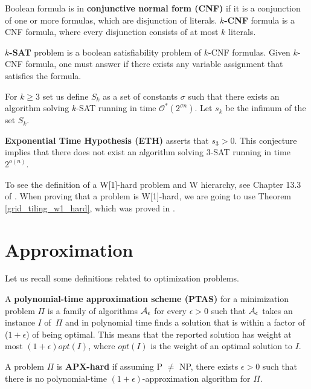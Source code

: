 \begin{defi}
\label{definition:cnf}
Boolean formula is in \textbf{conjunctive normal form (CNF)} if
it is a conjunction of one or more formulas,
which are disjunction of literals.
\textbf{$k$-CNF} formula is a CNF formula, where
every disjunction consists of at most $k$ literals.
\end{defi}

\begin{defi}
\textbf{$k$-SAT} problem is 
a boolean satisfiability problem of $k$-CNF formulas.
Given $k$-CNF formula, one must answer if there
exists any variable assignment that satisfies the formula.
\end{defi}

\begin{defi}
For $k \ge 3$ set us define $S_k$ as a set of constants $\sigma$
such that there exists an algorithm solving $k$-SAT running in time
$\mathcal{O}^{*}(2^{\sigma n})$.
Let $s_k$ be the infimum  of the set $S_k$.

\textbf{Exponential Time Hypothesis (ETH)} asserts
that $s_3 > 0$. This conjecture implies that
there does not exist an algorithm solving 3-SAT
running in time $2^{o(n)}$.
\end{defi}

To see the definition of a W[1]-hard problem and W hierarchy,
see Chapter 13.3 of \cite{platypus_book}.
When proving that a problem is W[1]-hard,
we are going to use Theorem 
\ref{grid_tiling_w1_hard}, which was proved in \cite{marx_grid_tiling}.

\section{Approximation}

Let us recall some definitions related to optimization problems.

\begin{defi}
A \textbf{polynomial-time approximation scheme (PTAS)}
for a minimization problem $\Pi$
is a family of algorithms $\cal{A}_\epsilon$ for
every $\epsilon > 0$
such that $\cal{A}_\epsilon$ takes an instance $I$ of~$\Pi$
and in polynomial time
finds a solution that is within a factor
of ($1+\epsilon$) of being optimal.
This means that the reported solution has weight at most
$(1+\epsilon)opt(I)$, where $opt(I)$ is the weight
of an optimal solution to $I$.
\end{defi}

\begin{defi}
A problem $\Pi$ is \textbf{APX-hard} if assuming P $\neq$ NP,
there exists $\epsilon > 0$
such that there is no polynomial-time $(1+\epsilon)$-approximation algorithm
for $\Pi$.
\end{defi}

